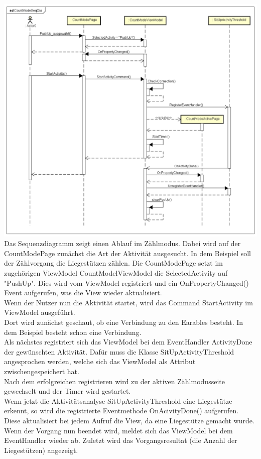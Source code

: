 \documentclass[a4paper,12pt]{article}
\begin{document}
\includegraphics[width=1.1\textwidth]{./Diagramme/CountModeSeqDia.png}\\
Das Sequenzdiagramm zeigt einen Ablauf im Zählmodus. Dabei wird auf der CountModePage zunächst die Art der Aktivität ausgesucht. In dem Beispiel soll der Zählvorgang die Liegestützen zählen.
Die CountModePage setzt im zugehörigen ViewModel CountModelViewModel die SelectedActivity auf "PushUp". Dies wird vom ViewModel registriert und ein OnPropertyChanged() Event aufgerufen, was die View wieder aktualisiert.\\
Wenn der Nutzer nun die Aktivität startet, wird das Command StartActivity im ViewModel ausgeführt.\\Dort wird zunächst geschaut, ob eine Verbindung zu den \gls{Earables} besteht. In dem Beispiel besteht schon eine Verbindung.\\
Als nächstes registriert sich das ViewModel bei dem EventHandler ActivityDone der gewünschten Aktivität. Dafür muss die Klasse SitUpActivityThreshold angesprochen werden, welche sich das ViewModel als Attribut zwischengespeichert hat.\\
Nach dem erfolgreichen registrieren wird zu der aktiven Zählmodusseite gewechselt und der Timer wird gestartet.\\
Wenn jetzt die Aktivitätsanalyse SitUpActivityThreshold eine Liegestütze erkennt, so wird die registrierte Eventmethode OnAcivityDone() aufgerufen. 
Diese aktualisiert bei jedem Aufruf die View, da eine Liegestütze gemacht wurde.\\
Wenn der Vorgang nun beendet wird, meldet sich das ViewModel bei dem EventHandler wieder ab. Zuletzt wird das Vorgangsresultat (die Anzahl der Liegestützen) angezeigt.\\ 
\end{document}
